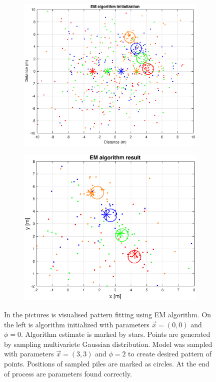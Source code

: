 \begin{figure}[H]
	\centering
	\begin{subfigure}{0.49\textwidth}
		\centering
		\includegraphics[scale=0.43]{fig/em_init.eps}
	\end{subfigure}
	\begin{subfigure}{.49\textwidth}
		\centering
		\includegraphics[scale=0.43]{fig/em_result.eps}

	\end{subfigure}
	
	\caption[EM pattern fitting]{In the pictures is visualised pattern fitting using EM algorithm. On the left is algorithm initialized with parameters $\vec{x}=(0, 0)$ and $\phi=0$. Algorithm estimate is marked by stars. Points are generated by sampling multivariete Gaussian distribution. Model was sampled with parameters $\vec{x}=(3, 3)$ and $\phi=2$ to create desired pattern of points. Positions of sampled piles are marked as circles. At the end of process are parameters found correctly.}
	\label{fig:em_pattern}
\end{figure}


